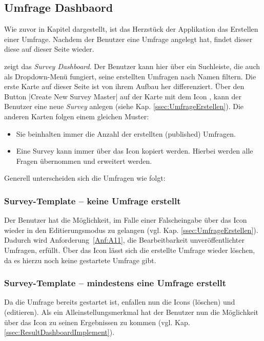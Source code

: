 \subsection{Umfrage Dashbaord}
\label{ssec:UmfrageDashboard}

Wie zuvor in Kapitel  dargestellt, ist das Herzstück der Applikation das Erstellen einer Umfrage.
Nachdem der Benutzer eine Umfrage  angelegt hat, findet dieser diese auf dieser Seite wieder.

\abb {} zeigt das \emph{Survey Dashboard}.
Der Benutzer kann hier über ein Suchleiste, die auch als Dropdown-Menü fungiert, seine erstellten Umfragen nach Namen filtern. \newline
Die erste Karte auf dieser Seite ist von ihrem Aufbau her differenziert.
Über den Button \jinline|Create New Survey Master| auf der Karte mit dem Icon \faPlusSquare, kann der Benutzer eine neue \emph{Survey} anlegen (siehe Kap. \vref{ssec:UmfrageErstellen}). \newline
Die anderen Karten folgen einem gleichen Muster:
% 
\begin{itemize}
	\item Sie beinhalten immer die Anzahl der erstellten (published) Umfragen.
	\item Eine Survey kann immer über das Icon \faCopy\xspace kopiert werden.
	Hierbei werden alle Fragen übernommen und erweitert werden.
\end{itemize}
%
Generell unterscheiden sich die Umfragen wie folgt:
% 
\subsubsection*{Survey-Template -- keine Umfrage erstellt}
%
Der Benutzer hat die Möglichkeit, im Falle einer Falscheingabe über das Icon \faEdit\xspace wieder in den Editierungsmodus zu gelangen (vgl. Kap. \vref{ssec:UmfrageErstellen}).
Dadurch wird Anforderung~\ref{Anf:A11}, die Bearbeitbarkeit unveröffentlichter Umfragen, erfüllt.
Über das Icon \faTrash\xspace lässt sich die erstellte Umfrage wieder löschen, da es hierzu noch keine gestartete Umfrage gibt.

\subsubsection*{Survey-Template -- mindestens eine Umfrage erstellt}
%
Da die Umfrage bereits gestartet ist, enfallen nun die Icons \faTrash\xspace (löschen) und \faEdit\xspace (editieren).
Als ein Alleinstellungsmerkmal hat der Benutzer nun die Möglichkeit über das Icon \faIdCard\xspace zu seinen Ergebnissen zu kommen (vgl. Kap. \vref{ssec:ResultDashboardImplement}).

